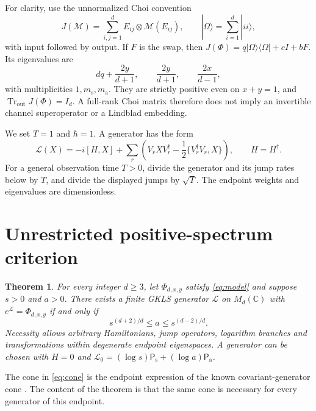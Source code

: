 \documentclass[11pt]{article}
\newcommand{\tr}{\operatorname{Tr}}
\newcommand{\Ps}{\mathsf{P}_{\mathrm{s}}}
\newcommand{\Pa}{\mathsf{P}_{\mathrm{a}}}
\newtheorem{theorem}{Theorem}
\begin{document}
For clarity, use the unnormalized Choi convention
\begin{equation}
 J(\mathcal M)=\sum_{i,j=1}^d E_{ij}\otimes\mathcal M(E_{ij}),\qquad
 |\Omega\rangle=\sum_{i=1}^d|ii\rangle,
\end{equation}
with input followed by output. If $F$ is the swap, then
$J(\Phi)=q|\Omega\rangle\langle\Omega|+cI+bF$.
Its eigenvalues are
\begin{equation}
 dq+\frac{2y}{d+1},\qquad
 \frac{2y}{d+1},\qquad \frac{2x}{d-1},             \label{eq:choichannel}
\end{equation}
with multiplicities $1,m_{\mathrm{s}},m_{\mathrm{a}}$.
They are strictly positive even on $x+y=1$, and
$\tr_{\mathrm{out}}J(\Phi)=I_d$. A full-rank Choi matrix therefore does
not imply an invertible channel superoperator or a Lindblad embedding.

We set $T=1$ and $\hbar=1$. A generator has the form
\begin{equation}
 \mathcal L(X)=-i[H,X]
 +\sum_r\left(V_rXV_r^\dagger-\frac12\{V_r^\dagger V_r,X\}\right),
 \qquad H=H^\dagger.                              \label{eq:GKLS}
\end{equation}
For a general observation time $T>0$, divide the generator and its jump
rates below by $T$, and divide the displayed jumps by $\sqrt T$.
The endpoint weights and eigenvalues are dimensionless.

\section{Unrestricted positive-spectrum criterion}

\begin{theorem}\label{thm:positive}
For every integer $d\geq3$, let $\Phi_{d,x,y}$ satisfy \eqref{eq:model}
and suppose $s>0$ and $a>0$. There exists a finite GKLS generator
$\mathcal L$ on $M_d(\mathbb C)$ with $e^{\mathcal L}=\Phi_{d,x,y}$
if and only if
\begin{equation}
             s^{(d+2)/d}\leq a\leq s^{(d-2)/d}.     \label{eq:cone}
\end{equation}
Necessity allows arbitrary Hamiltonians, jump operators, logarithm branches
and transformations within degenerate endpoint eigenspaces.
A generator can be chosen with $H=0$ and
$\mathcal L_0=(\log s)\Ps+(\log a)\Pa$.
\end{theorem}

The cone in \eqref{eq:cone} is the endpoint expression of the known
covariant-generator cone \cite{Bhat2023}. The content of the theorem is
that the same cone is necessary for every generator of this endpoint.
\end{document}
